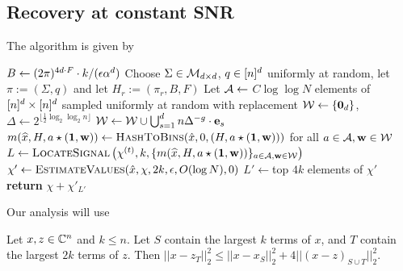 \subsection{Recovery at constant SNR}\label{sec:const-snr}
The algorithm is given by

\begin{algorithm}[H]
\caption{\textsc{RecoverAtConstantSNR}($\hat x, \chi, k, \e$)}\label{alg:const-snr} 
\begin{algorithmic}[1] 
\State $B\gets  (2\pi)^{4d\cdot F}\cdot k/({\epsilon}\alpha^d)$
\State Choose $\Sigma\in \mathcal{M}_{d\times d}$, $q\in {[n]^d}$ uniformly at random, let $\pi:=(\Sigma, q)$ and let $H_r:=(\pi_r, B, F)$
\State Let ${\mathcal{A}}\gets $ $C\log\log N$ elements of ${[n]^d}\times {[n]^d}$ sampled uniformly at random with replacement
\State $\mathcal{W}\gets \{\mathbf{0}_d\}$, $\Delta\gets 2^{\lfloor \frac1{2}\log_2 \log_2 n\rfloor}$ 
\State $\mathcal{W}\gets \mathcal{W}\cup \bigcup_{s=1}^d n \Delta^{-g} \cdot \mathbf{e}_s$ 
\EndFor
\For {$\h\in \H$}
\State $m(\wh{x}, H, a\star(\one, \h))\gets \Call{HashToBins}{\hat x, 0, (H, a\star (\one, \h))}$ for all $a\in {\mathcal{A}}, \mathbf{w}\in \mathcal{W}$
\EndFor
\State $L \gets \textsc{LocateSignal}\left(\chi^{(t)}, k, \{m(\widehat{x}, H, a\star (\mathbf{1}, \mathbf{w}))\}_{a\in {\mathcal{A}}, \mathbf{w}\in \mathcal{W}}\right)$
\State $\chi' \gets \Call{EstimateValues}{\hat x,  \chi, 2k, \e, O(\log N), 0}$
\State $L'\gets $top $4k$ elements of $\chi'$
\State \textbf{return} $\chi+\chi'_{L'}$
\EndProcedure 
\end{algorithmic}
\end{algorithm}


Our analysis will use 
\begin{lemma}\label{lm:comparison}
Let $x, z\in \mathbb{C}^n$ and $k\leq n$. Let $S$ contain the largest $k$ terms of $x$, and $T$ contain the largest $2k$ terms of $z$. Then $||x-z_T||_2^2\leq ||x-x_S||_2^2+4||(x-z)_{S\cup T}||_2^2$.
\end{lemma}



